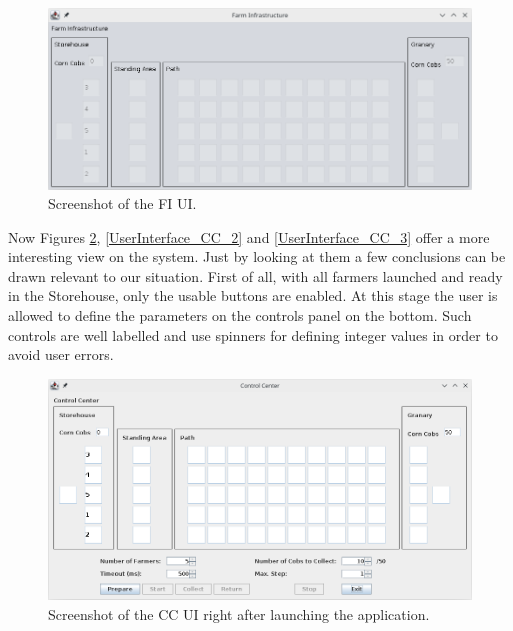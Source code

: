 \documentclass[12pt]{article}
\begin{document}
\begin{figure}[H]
  \centering
  \begin{minipage}{.9\textwidth}
    \centering
    \includegraphics[width=\linewidth]{img/UserInterface_FI.png}
  \end{minipage}%
  \caption{Screenshot of the FI UI.}
  \label{UserInterface_FI}
\end{figure} 

Now Figures \ref{UserInterface_CC_1}, \ref{UserInterface_CC_2} and \ref{UserInterface_CC_3} offer a more interesting view on the system.
Just by looking at them a few conclusions can be drawn relevant to our situation.
First of all, with all farmers launched and ready in the Storehouse, only the usable buttons are enabled.
At this stage the user is allowed to define the parameters on the controls panel on the bottom.
Such controls are well labelled and use spinners for defining integer values in order to avoid user errors.

\vspace{-5pt}
\begin{figure}[H]
  \centering
  \begin{minipage}{.9\textwidth}
    \centering
    \includegraphics[width=\linewidth]{img/UserInterface_CC_1.png}
  \end{minipage}%
  \caption{Screenshot of the CC UI right after launching the application.}
  \label{UserInterface_CC_1}
\end{figure}
\vspace{-10pt}
\end{document}
